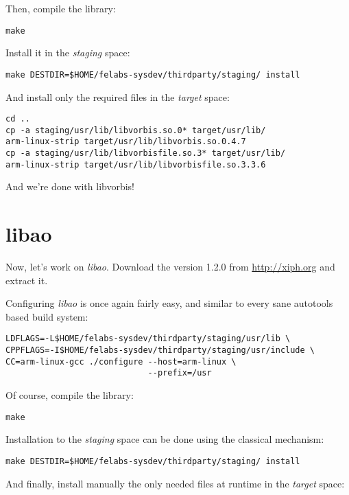 Then, compile the library:

\begin{verbatim}
make
\end{verbatim}

Install it in the {\em staging} space:

\begin{verbatim}
make DESTDIR=$HOME/felabs-sysdev/thirdparty/staging/ install
\end{verbatim}

And install only the required files in the {\em target} space:

\begin{verbatim}
cd ..
cp -a staging/usr/lib/libvorbis.so.0* target/usr/lib/
arm-linux-strip target/usr/lib/libvorbis.so.0.4.7
cp -a staging/usr/lib/libvorbisfile.so.3* target/usr/lib/
arm-linux-strip target/usr/lib/libvorbisfile.so.3.3.6
\end{verbatim}

And we're done with libvorbis!

\section{libao}

Now, let's work on {\em libao}. Download the version 1.2.0 from
\url{http://xiph.org} and extract it.

Configuring {\em libao} is once again fairly easy, and similar to
every sane autotools based build system:

\begin{verbatim}
LDFLAGS=-L$HOME/felabs-sysdev/thirdparty/staging/usr/lib \
CPPFLAGS=-I$HOME/felabs-sysdev/thirdparty/staging/usr/include \
CC=arm-linux-gcc ./configure --host=arm-linux \
                             --prefix=/usr
\end{verbatim}

Of course, compile the library:

\begin{verbatim}
make
\end{verbatim}

Installation to the {\em staging} space can be done using the
classical  mechanism:

\begin{verbatim}
make DESTDIR=$HOME/felabs-sysdev/thirdparty/staging/ install
\end{verbatim}

And finally, install manually the only needed files at runtime in the
{\em target} space:

